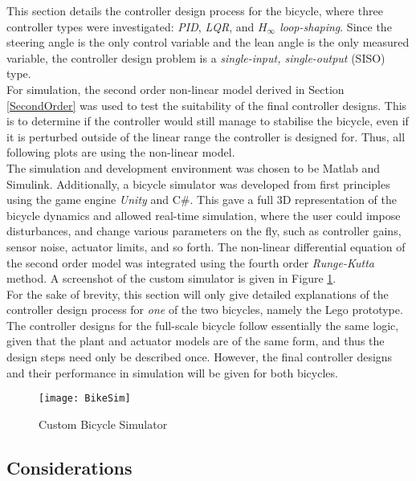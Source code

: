 This section details the controller design process for the bicycle, where three controller types were investigated: \textit{PID}, \textit{LQR}, and \textit{$H_{\infty}$ loop-shaping}. Since the steering angle is the only control variable and the lean angle is the only measured variable, the controller design problem is a \textit{single-input, single-output} (SISO) type. \\

For simulation, the second order non-linear model derived in Section \ref{SecondOrder} was used to test the suitability of the final controller designs. This is to determine if the controller would still manage to stabilise the bicycle, even if it is perturbed outside of the linear range the controller is designed for. Thus, all following plots are using the non-linear model. \\

The simulation and development environment was chosen to be Matlab and Simulink. Additionally, a bicycle simulator was developed from first principles using the game engine \textit{Unity} and C\#. This gave a full 3D representation of the bicycle dynamics and allowed real-time simulation, where the user could impose disturbances, and change various parameters on the fly, such as controller gains, sensor noise, actuator limits, and so forth. The non-linear differential equation of the second order model was integrated using the fourth order \textit{Runge-Kutta} method. A screenshot of the custom simulator is given in Figure \ref{fig:bikesim}. \\

For the sake of brevity, this section will only give detailed explanations of the controller design process for \textit{one} of the two bicycles, namely the Lego prototype. The controller designs for the full-scale bicycle follow essentially the same logic, given that the plant and actuator models are of the same form, and thus the design steps need only be described once. However, the final controller designs and their performance in simulation will be given for both bicycles.

\begin{figure}[H]
	\centering
	\texttt{[image: BikeSim]}
	\caption{Custom Bicycle Simulator}
	\label{fig:bikesim}
\end{figure}

\subsection{Considerations}
